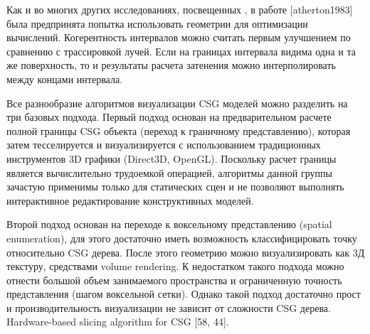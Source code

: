 {{{{Как и во многих других исследованиях, посвещенных , в работе [atherton1983] была предпринята попытка использовать  геометрии для оптимизации вычислений. Когерентность интервалов можно считать первым улучшением по сравнению с трассировкой лучей. Если на границах интервала видима одна и та же поверхность, то и результаты расчета затенения можно интерполировать между концами интервала.

Все разнообразие алгоритмов визуализации CSG моделей можно разделить на три базовых подхода. Первый подход основан на предварительном расчете полной границы CSG объекта (переход к граничному представлению), которая затем тесселируется и визуализируется с использованием традиционных инструментов 3D графики (Direct3D, OpenGL). Поскольку расчет границы является  вычислительно трудоемкой операцией, алгоритмы данной группы зачастую применимы только для статических сцен и не позволяют выполнять интерактивное редактирование конструктивных моделей.

Второй подход основан на переходе к воксельному представлению (spatial enumeration), для этого достаточно иметь возможность классифицировать точку относительно CSG дерева. После этого геометрию можно визуализировать как 3Д текстуру, средствами volume rendering. К недостатком такого подхода можно отнести большой объем занимаемого пространства и ограниченную точность представления (шагом воксельной сетки). Однако такой подход достаточно прост и производительность визуализации не зависит от сложности CSG дерева. Hardware-based slicing algorithm for CSG [58, 44].

}}}}

